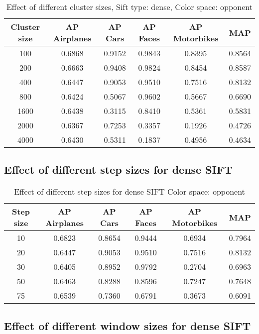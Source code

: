\begin{table}[H]
\begin{tabular}{|c|ccccc|}
\hline
\textbf{Cluster size} & \textbf{AP Airplanes} & \textbf{AP Cars} & \textbf{AP Faces} & \textbf{AP Motorbikes} & \textbf{MAP}\\
\hline
100& 0.6868 & 0.9152 & 0.9843 & 0.8395 & 0.8564\\
200 & 0.6663 & 0.9408 & 0.9824 & 0.8454 & 0.8587\\
400 & 0.6447 & 0.9053 & 0.9510 & 0.7516 & 0.8132\\
800 & 0.6424 & 0.5067 & 0.9602 & 0.5667 & 0.6690\\
1600 & 0.6438 & 0.3115 & 0.8410 & 0.5361 & 0.5831\\
2000 & 0.6367 & 0.7253 & 0.3357 & 0.1926 & 0.4726\\
4000 & 0.6430 & 0.5311 & 0.1837 & 0.4956 & 0.4634\\
\hline
\end{tabular}
\caption{Effect of different cluster sizes, Sift type: dense, Color space: opponent}
\end{table}

\subsection{Effect of different step sizes for dense SIFT}

\begin{table}[H]
\begin{tabular}{|c|ccccc|}
\hline
\textbf{Step size} & \textbf{AP Airplanes} & \textbf{AP Cars} & \textbf{AP Faces} & \textbf{AP Motorbikes} & \textbf{MAP}\\
\hline
10 & 0.6823 & 0.8654 & 0.9444 & 0.6934 & 0.7964\\
20 & 0.6447 & 0.9053 & 0.9510 & 0.7516 & 0.8132\\
30 & 0.6405 &  0.8952& 0.9792& 0.2704 & 0.6963\\
50 & 0.6463 & 0.8288 & 0.8596 & 0.7247 & 0.7648\\
75 & 0.6539 & 0.7360 & 0.6791 & 0.3673 & 0.6091\\
\hline
\end{tabular}
\caption{Effect of different step sizes for dense SIFT Color space: opponent}
\end{table}



\subsection{Effect of different window sizes for dense SIFT}


